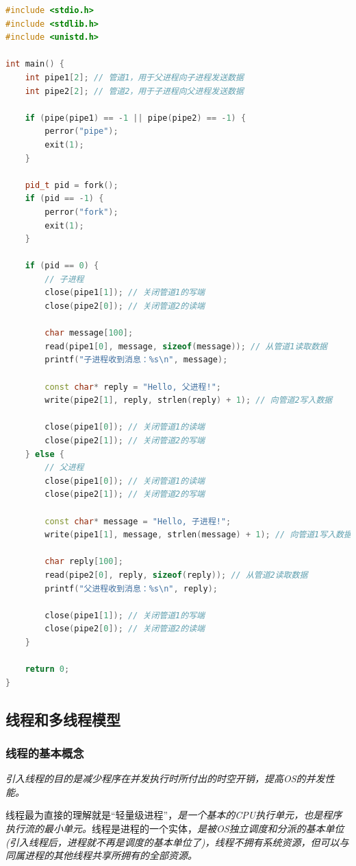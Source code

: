 \begin{lstlisting}[language=C++]
#include <stdio.h>
#include <stdlib.h>
#include <unistd.h>

int main() {
    int pipe1[2]; // 管道1，用于父进程向子进程发送数据
    int pipe2[2]; // 管道2，用于子进程向父进程发送数据

    if (pipe(pipe1) == -1 || pipe(pipe2) == -1) {
        perror("pipe");
        exit(1);
    }

    pid_t pid = fork();
    if (pid == -1) {
        perror("fork");
        exit(1);
    }

    if (pid == 0) {
        // 子进程
        close(pipe1[1]); // 关闭管道1的写端
        close(pipe2[0]); // 关闭管道2的读端

        char message[100];
        read(pipe1[0], message, sizeof(message)); // 从管道1读取数据
        printf("子进程收到消息：%s\n", message);

        const char* reply = "Hello, 父进程!";
        write(pipe2[1], reply, strlen(reply) + 1); // 向管道2写入数据

        close(pipe1[0]); // 关闭管道1的读端
        close(pipe2[1]); // 关闭管道2的写端
    } else {
        // 父进程
        close(pipe1[0]); // 关闭管道1的读端
        close(pipe2[1]); // 关闭管道2的写端

        const char* message = "Hello, 子进程!";
        write(pipe1[1], message, strlen(message) + 1); // 向管道1写入数据

        char reply[100];
        read(pipe2[0], reply, sizeof(reply)); // 从管道2读取数据
        printf("父进程收到消息：%s\n", reply);

        close(pipe1[1]); // 关闭管道1的写端
        close(pipe2[0]); // 关闭管道2的读端
    }

    return 0;
}
\end{lstlisting}

\subsection{线程和多线程模型}

\subsubsection{线程的基本概念}

    \emph{引入线程的目的是减少程序在并发执行时所付出的时空开销，提高OS的并发性能。}

    线程最为直接的理解就是“轻量级进程”，\emph{是一个基本的CPU执行单元，也是程序执行流的最小单元。}线程是进程的一个实体，\emph{{\color{red}是被OS独立调度和分派的基本单位}(引入线程后，进程就不再是调度的基本单位了)，线程不拥有系统资源，但可以与同属进程的其他线程共享所拥有的全部资源。}

